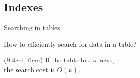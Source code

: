\documentclass[xcolor=table]{beamer}
\begin{document}
\subsection{Indexes}

\begin{frame}{Searching in tables}
  \begin{block}{}
    \Large
    \centering
    How to efficiently search for data in a table?
  \end{block}
  
  \begin{flushleft}
  \end{flushleft}

  \begin{textblock*}{3.5cm}(9.4cm, 6cm)
    \footnotesize
    If the table has $n$ rows, \\the search cost is $O(n)$.
  \end{textblock*}

\end{frame}
\end{document}
